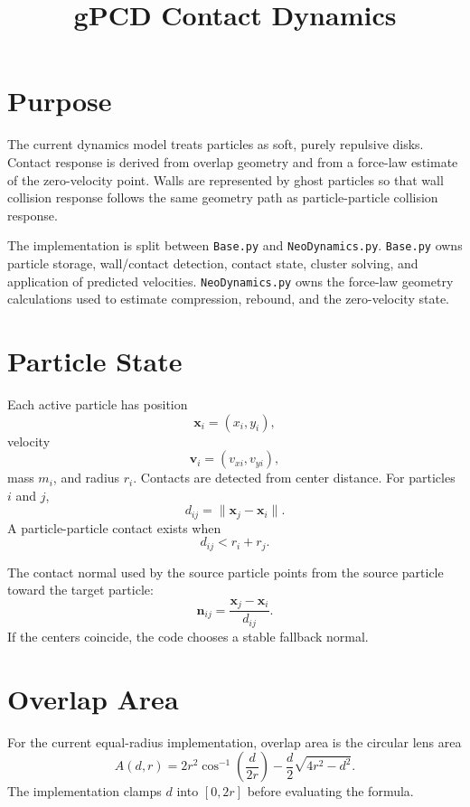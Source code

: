 \documentclass[11pt]{article}
\title{gPCD Contact Dynamics}
\author{}
\date{}
\begin{document}
\maketitle



\section{Purpose}

The current dynamics model treats particles as soft, purely repulsive disks.
Contact response is derived from overlap geometry and from a force-law estimate
of the zero-velocity point. Walls are represented by ghost particles so that
wall collision response follows the same geometry path as particle-particle
collision response.

The implementation is split between \texttt{Base.py} and
\texttt{NeoDynamics.py}. \texttt{Base.py} owns particle storage, wall/contact
detection, contact state, cluster solving, and application of predicted
velocities. \texttt{NeoDynamics.py} owns the force-law geometry calculations
used to estimate compression, rebound, and the zero-velocity state.

\section{Particle State}

Each active particle has position
\[
    \mathbf{x}_i = (x_i, y_i),
\]
velocity
\[
    \mathbf{v}_i = (v_{xi}, v_{yi}),
\]
mass \(m_i\), and radius \(r_i\). Contacts are detected from center distance.
For particles \(i\) and \(j\),
\[
    d_{ij} = \lVert \mathbf{x}_j - \mathbf{x}_i \rVert.
\]
A particle-particle contact exists when
\[
    d_{ij} < r_i + r_j.
\]

The contact normal used by the source particle points from the source particle
toward the target particle:
\[
    \mathbf{n}_{ij}
    =
    \frac{\mathbf{x}_j - \mathbf{x}_i}{d_{ij}}.
\]
If the centers coincide, the code chooses a stable fallback normal.

\section{Overlap Area}

For the current equal-radius implementation, overlap area is the circular lens
area
\[
    A(d, r)
    =
    2r^2 \cos^{-1}\left(\frac{d}{2r}\right)
    -
    \frac{d}{2}\sqrt{4r^2 - d^2}.
\]
The implementation clamps \(d\) into \([0, 2r]\) before evaluating the formula.
\end{document}

